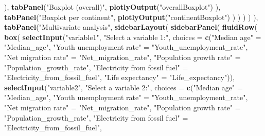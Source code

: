 \documentclass[
]{article}
\newenvironment{Shaded}{\begin{snugshade}}{\end{snugshade}}
\newcommand{\AttributeTok}[1]{\textcolor[rgb]{0.13,0.29,0.53}{#1}}
\newcommand{\FunctionTok}[1]{\textcolor[rgb]{0.13,0.29,0.53}{\textbf{#1}}}
\newcommand{\NormalTok}[1]{#1}
\newcommand{\OtherTok}[1]{\textcolor[rgb]{0.56,0.35,0.01}{#1}}
\newcommand{\StringTok}[1]{\textcolor[rgb]{0.31,0.60,0.02}{#1}}
\begin{document}
\begin{Shaded}
\begin{Highlighting}[]
\NormalTok{            ),}
            \FunctionTok{tabPanel}\NormalTok{(}\StringTok{"Boxplot (overall)"}\NormalTok{,}
              \FunctionTok{plotlyOutput}\NormalTok{(}\StringTok{"overallBoxplot"}\NormalTok{)}
\NormalTok{            ),}
            \FunctionTok{tabPanel}\NormalTok{(}\StringTok{"Boxplot per continent"}\NormalTok{,}
              \FunctionTok{plotlyOutput}\NormalTok{(}\StringTok{"continentBoxplot"}\NormalTok{)}
\NormalTok{            )}
\NormalTok{          )}
\NormalTok{        )}
\NormalTok{      )}
\NormalTok{    ),}
    \FunctionTok{tabPanel}\NormalTok{(}\StringTok{"Multivariate analysis"}\NormalTok{,}
      \FunctionTok{sidebarLayout}\NormalTok{(}
        \FunctionTok{sidebarPanel}\NormalTok{(}
          \FunctionTok{fluidRow}\NormalTok{(}
            \FunctionTok{box}\NormalTok{(}
              \FunctionTok{selectInput}\NormalTok{(}\StringTok{"variable1"}\NormalTok{, }\StringTok{"Select a variable 1:"}\NormalTok{,}
                         \AttributeTok{choices =} \FunctionTok{c}\NormalTok{(}\StringTok{"Median age"}                   \OtherTok{=} \StringTok{"Median\_age"}\NormalTok{,}
                                     \StringTok{"Youth unemployment rate"}      \OtherTok{=} \StringTok{"Youth\_unemployment\_rate"}\NormalTok{,}
                                     \StringTok{"Net migration rate"}           \OtherTok{=} \StringTok{"Net\_migration\_rate"}\NormalTok{,}
                                     \StringTok{"Population growth rate"}       \OtherTok{=} \StringTok{"Population\_growth\_rate"}\NormalTok{,}
                                     \StringTok{"Electricity from fossil fuel"} \OtherTok{=} \StringTok{"Electricity\_from\_fossil\_fuel"}\NormalTok{,}
                                     \StringTok{"Life expectancy"}              \OtherTok{=} \StringTok{"Life\_expectancy"}\NormalTok{)),}
              \FunctionTok{selectInput}\NormalTok{(}\StringTok{"variable2"}\NormalTok{, }\StringTok{"Select a variable 2:"}\NormalTok{,}
                         \AttributeTok{choices =} \FunctionTok{c}\NormalTok{(}\StringTok{"Median age"}                   \OtherTok{=} \StringTok{"Median\_age"}\NormalTok{,}
                                     \StringTok{"Youth unemployment rate"}      \OtherTok{=} \StringTok{"Youth\_unemployment\_rate"}\NormalTok{,}
                                     \StringTok{"Net migration rate"}           \OtherTok{=} \StringTok{"Net\_migration\_rate"}\NormalTok{,}
                                     \StringTok{"Population growth rate"}       \OtherTok{=} \StringTok{"Population\_growth\_rate"}\NormalTok{,}
                                     \StringTok{"Electricity from fossil fuel"} \OtherTok{=} \StringTok{"Electricity\_from\_fossil\_fuel"}\NormalTok{,}

\end{Highlighting}
\end{Shaded}
\end{document}
